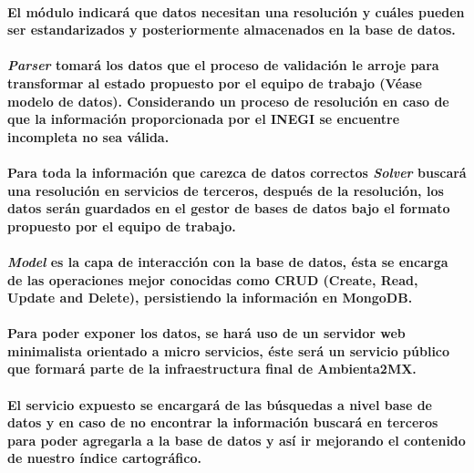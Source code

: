     \paragraph{El módulo indicará que datos necesitan una resolución y cuáles pueden ser estandarizados y posteriormente almacenados en la base de datos.}
    \paragraph{\textbf{\emph{Parser}} tomará los datos que el proceso de validación le arroje para transformar al estado propuesto por el equipo de trabajo (Véase modelo de datos). Considerando un proceso de resolución en caso de que la información proporcionada por el INEGI se encuentre incompleta no sea válida.}
    \paragraph{Para toda la información que carezca de datos correctos \textbf{\emph{Solver}} buscará una resolución en servicios de terceros, después de la resolución, los datos serán guardados en el gestor de bases de datos bajo el formato propuesto por el equipo de trabajo.}
    \paragraph{\textbf{\emph{Model}} es la capa de interacción con la base de datos, ésta se encarga de las operaciones mejor conocidas como CRUD (Create, Read, Update and Delete),  persistiendo la información en MongoDB.}
    \paragraph{Para poder exponer los datos, se hará uso de un servidor web minimalista orientado a micro servicios, éste será un servicio público que formará parte de la infraestructura final de Ambienta2MX.}
    \paragraph{El servicio expuesto se encargará de las búsquedas a nivel base de datos y en caso de no encontrar la información buscará en terceros para poder agregarla a la base de datos y así ir mejorando el contenido de nuestro índice cartográfico.}